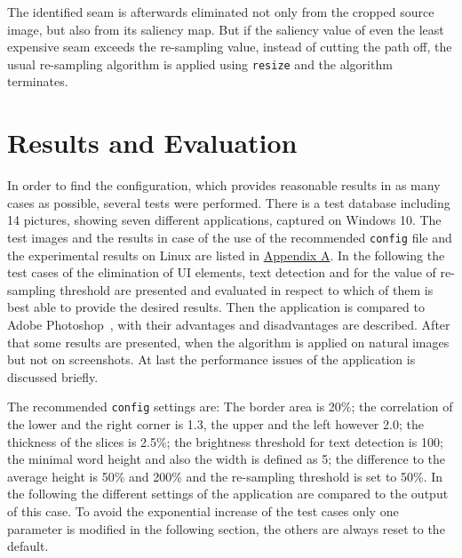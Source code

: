 \documentclass[draft,final]{vutinfth} %
\begin{document}
	The identified seam is afterwards eliminated not only from the cropped source image, but also from its saliency map.
	But if the saliency value of even the least expensive seam exceeds the re-sampling value, instead of cutting the path off, the usual re-sampling algorithm is applied using \texttt{resize} and the algorithm terminates.  
	
	\chapter{Results and Evaluation}
	In order to find the configuration, which provides reasonable results in as many cases as possible, several tests were performed.
	There is a test database including 14 pictures, showing seven different applications, captured on Windows 10.
	The test images and the results in case of the use of the recommended \texttt{config} file and the experimental results on Linux are listed in \hyperref[AppA]{Appendix A}. 
	In the following the test cases of the elimination of UI elements, text detection and for the value of re-sampling threshold are presented and evaluated in respect to which of them is best able to provide the desired results.
	Then the application is compared to Adobe Photoshop~\cite{photoshop}, with their advantages and disadvantages are described.
	After that some results are presented, when the algorithm is applied on natural images but not on screenshots.
	At last the performance issues of the application is discussed briefly.\par 
	The recommended \texttt{config} settings are:
	The border area is 20\%; the correlation of the lower and the right corner is 1.3, the upper and the left however 2.0; the thickness of the slices is 2.5\%; the brightness threshold for text detection is 100; the minimal word height and also the width is defined as 5; the difference to the average height is 50\% and 200\% and the re-sampling threshold is set to 50\%.
	In the following the different settings of the application are compared to the output of this case.
	To avoid the exponential increase of the test cases only one parameter is modified in the following section, the others are always reset to the default. 
\end{document}
